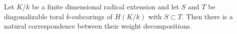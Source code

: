 Let $K/k$ be a finite dimensional radical extension and let $S$ and $T$ be diagonalizable toral $k$-subcorings of $H(K/k)$ with $S \subset T$. Then there is a natural correspondence between their weight decompositions.
